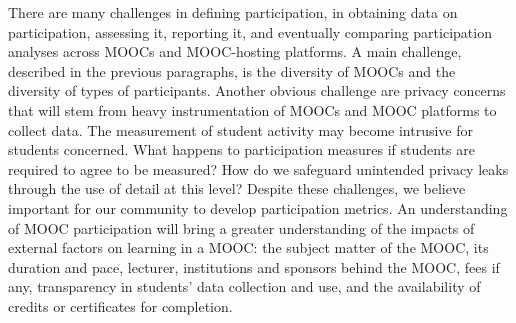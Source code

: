  There are many challenges in defining participation, in
obtaining data on participation, assessing it, reporting it, and
eventually comparing participation analyses across MOOCs and
MOOC-hosting platforms. A main challenge, described in the previous
paragraphs, is the diversity of MOOCs and the diversity of types of
participants. Another obvious challenge are privacy concerns that will
stem from heavy instrumentation of MOOCs and MOOC platforms to collect
data. The measurement of student activity may become intrusive for
students concerned. What happens to participation measures if students
are required to agree to be measured? How do we safeguard unintended
privacy leaks through the use of detail at this level?  Despite these
challenges, we believe important for our community to develop
participation metrics. An understanding of MOOC participation will bring
a greater understanding of the impacts of external factors on learning
in a MOOC: the subject matter of the MOOC, its duration and pace,
lecturer, institutions and sponsors behind the MOOC, fees if any,
transparency in students' data collection and use, and the availability
of credits or certificates for completion.

